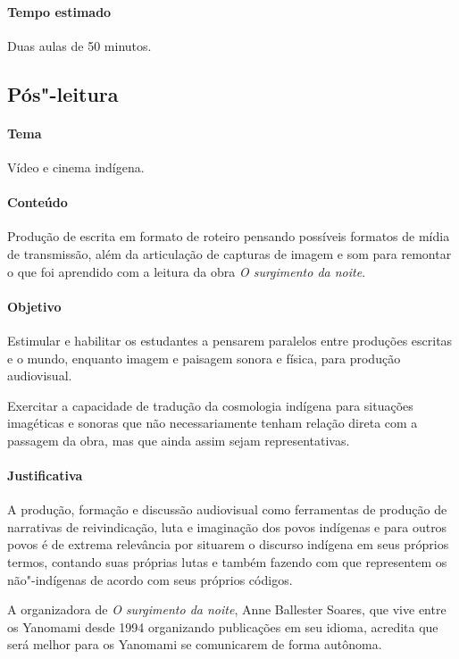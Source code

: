 \documentclass[12pt]{extarticle}
\begin{document}


\paragraph{Tempo estimado} Duas aulas de 50 minutos.


\subsection{Pós"-leitura}

\paragraph{Tema} Vídeo e cinema indígena.

\paragraph{Conteúdo} Produção de escrita em formato de roteiro pensando possíveis
formatos de mídia de transmissão, além da articulação de capturas de imagem e som 
para remontar o que foi aprendido com a leitura da obra \textit{O surgimento da noite}.

\paragraph{Objetivo} Estimular e habilitar os estudantes a pensarem paralelos 
entre produções escritas e o mundo, enquanto imagem e paisagem sonora e física,
para produção audiovisual. 

Exercitar a capacidade de tradução da cosmologia indígena para situações imagéticas
e sonoras que não necessariamente tenham relação direta com a passagem da obra, mas 
que ainda assim sejam representativas.

\paragraph{Justificativa} A produção, formação e discussão audiovisual como ferramentas 
de produção de narrativas de reivindicação, luta e imaginação dos povos indígenas e para 
outros povos é de extrema relevância por situarem o discurso indígena em seus próprios 
termos, contando suas próprias lutas e também fazendo com que representem os não"-indígenas 
de acordo com seus próprios códigos.

A organizadora de \textit{O surgimento da noite}, Anne Ballester Soares, que vive entre os Yanomami 
desde 1994 organizando publicações em seu idioma, acredita que será melhor para os Yanomami 
se comunicarem de forma autônoma.
\end{document}
